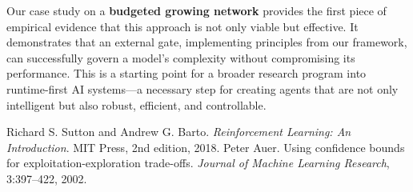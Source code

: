 \documentclass[
]{article}
\begin{document}
Our case study on a \textbf{budgeted growing network} provides the first
piece of empirical evidence that this approach is not only viable but
effective. It demonstrates that an external gate, implementing
principles from our framework, can successfully govern a model's
complexity without compromising its performance. This is a starting
point for a broader research program into runtime-first AI systems---a
necessary step for creating agents that are not only intelligent but
also robust, efficient, and controllable.

\begin{thebibliography}{9}
 Richard S. Sutton and Andrew G. Barto. \emph{Reinforcement Learning: An Introduction}. MIT Press, 2nd edition, 2018.
 Peter Auer. Using confidence bounds for exploitation-exploration trade-offs. \emph{Journal of Machine Learning Research}, 3:397--422, 2002.
\end{thebibliography}
\end{document}

